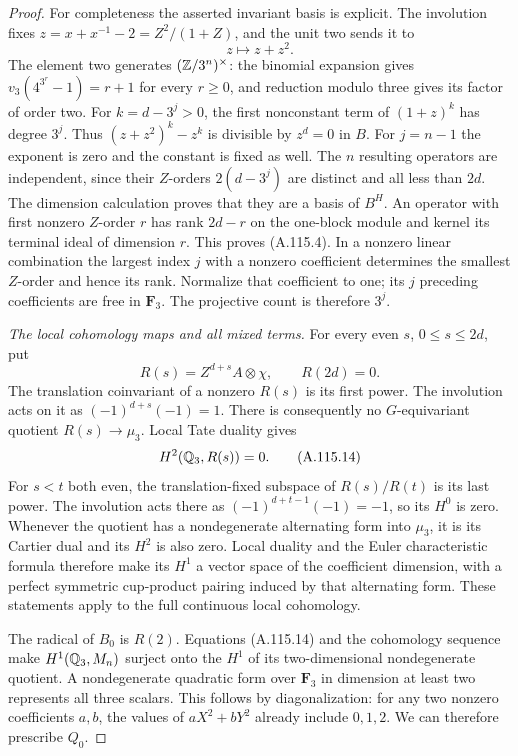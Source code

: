 \begin{proof}
For completeness the asserted invariant basis
is explicit.  The involution fixes
$z=x+x^{-1}-2=Z^2/(1+Z)$, and the unit two sends it to
\[
                              z\longmapsto z+z^2.
\tag{A.115.12}
\]
The element two generates $(\mathbb Z/3^n)^\times$:
the binomial expansion gives
$v_3(4^{3^r}-1)=r+1$ for every $r\geq0$,
and reduction modulo three gives its factor
of order two.
For $k=d-3^j>0$, the first nonconstant term
of $(1+z)^k$ has degree $3^j$.  Thus
$(z+z^2)^k-z^k$ is divisible by $z^d=0$
in $B$.
For $j=n-1$ the exponent is zero and the
constant is fixed as well.
The $n$ resulting operators are independent,
since their $Z$-orders $2(d-3^j)$ are
distinct and all less than $2d$.
The dimension calculation proves that they
are a basis of $B^H$.
An operator with first nonzero $Z$-order $r$
has rank $2d-r$ on the one-block module and
kernel its terminal ideal of dimension $r$.
This proves (A.115.4).  In a nonzero linear
combination the largest index $j$ with a
nonzero coefficient determines the smallest
$Z$-order and hence its rank.  Normalize that
coefficient to one; its $j$ preceding
coefficients are free in $\mathbf F_3$.
The projective count is therefore $3^j$.

\emph{The local cohomology maps and all mixed terms.}
For every even $s$, $0\leq s\leq2d$, put
\[
 R(s)=Z^{d+s}A\otimes\chi,
                         \qquad R(2d)=0.
\tag{A.115.13}
\]
The translation coinvariant of a nonzero
$R(s)$ is its first power.  The involution
acts on it as $(-1)^{d+s}(-1)=1$.
There is consequently no $G$-equivariant
quotient $R(s)\to\mu_3$.
Local Tate duality gives
\[
                             H^2(\mathbb Q_3,R(s))=0.
\tag{A.115.14}
\]
For $s<t$ both even, the translation-fixed
subspace of $R(s)/R(t)$ is its last power.
The involution acts there as
$(-1)^{d+t-1}(-1)=-1$, so its $H^0$ is zero.
Whenever the quotient has a nondegenerate
alternating form into $\mu_3$, it is its
Cartier dual and its $H^2$ is also zero.
Local duality and the Euler characteristic
formula \cite[I, Corollary 2.3 and Theorem 2.8]{BIR_MilneADT}
therefore make its $H^1$ a vector space of
the coefficient dimension, with a perfect
symmetric cup-product pairing induced by that
alternating form.  These statements apply
to the full continuous local cohomology.

The radical of $B_0$ is $R(2)$.
Equations (A.115.14) and the cohomology
sequence make $H^1(\mathbb Q_3,M_n)$ surject onto
the $H^1$ of its two-dimensional
nondegenerate quotient.
A nondegenerate quadratic form over
$\mathbf F_3$ in dimension at least two
represents all three scalars.  This follows
by diagonalization: for any two nonzero
coefficients $a,b$, the values of
$aX^2+bY^2$ already include $0,1,2$.
We can therefore prescribe $Q_0$.


\end{proof}
